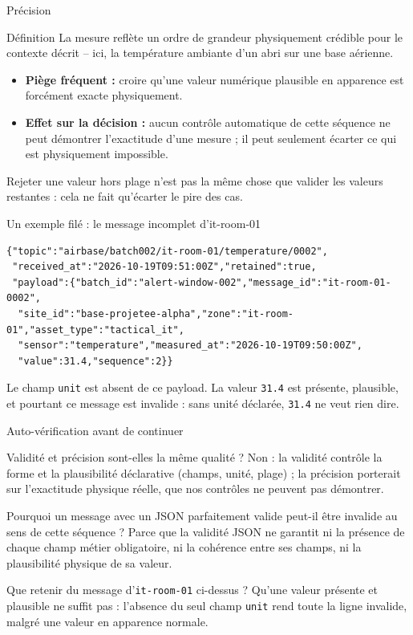 \documentclass[aspectratio=169]{beamer}
\begin{document}
\begin{frame}{Précision}
  \begin{block}{Définition}
    La mesure reflète un ordre de grandeur physiquement crédible pour le contexte décrit -- ici, la température ambiante d'un abri sur une base aérienne.
  \end{block}
  \begin{itemize}
    \item \textbf{Piège fréquent :} croire qu'une valeur numérique plausible en apparence est forcément exacte physiquement.
    \item \textbf{Effet sur la décision :} aucun contrôle automatique de cette séquence ne peut démontrer l'exactitude d'une mesure ; il peut seulement écarter ce qui est physiquement impossible.
  \end{itemize}
  \alert{Rejeter une valeur hors plage n'est pas la même chose que valider les valeurs restantes : cela ne fait qu'écarter le pire des cas.}
\end{frame}

\begin{frame}[fragile]{Un exemple filé : le message incomplet d'it-room-01}
  \scriptsize
  \begin{verbatim}
{"topic":"airbase/batch002/it-room-01/temperature/0002",
 "received_at":"2026-10-19T09:51:00Z","retained":true,
 "payload":{"batch_id":"alert-window-002","message_id":"it-room-01-0002",
  "site_id":"base-projetee-alpha","zone":"it-room-01","asset_type":"tactical_it",
  "sensor":"temperature","measured_at":"2026-10-19T09:50:00Z",
  "value":31.4,"sequence":2}}
  \end{verbatim}
  \normalsize
  \alert{Le champ \texttt{unit} est absent de ce payload. La valeur \texttt{31.4} est présente, plausible, et pourtant ce message est invalide : sans unité déclarée, \texttt{31.4} ne veut rien dire.}
\end{frame}

\begin{frame}{Auto-vérification avant de continuer}
  \small
  \begin{block}{Validité et précision sont-elles la même qualité ?}
    Non : la validité contrôle la forme et la plausibilité déclarative (champs, unité, plage) ; la précision porterait sur l'exactitude physique réelle, que nos contrôles ne peuvent pas démontrer.
  \end{block}
  \begin{block}{Pourquoi un message avec un JSON parfaitement valide peut-il être invalide au sens de cette séquence ?}
    Parce que la validité JSON ne garantit ni la présence de chaque champ métier obligatoire, ni la cohérence entre ses champs, ni la plausibilité physique de sa valeur.
  \end{block}
  \begin{block}{Que retenir du message d'\texttt{it-room-01} ci-dessus ?}
    Qu'une valeur présente et plausible ne suffit pas : l'absence du seul champ \texttt{unit} rend toute la ligne invalide, malgré une valeur en apparence normale.
  \end{block}
\end{frame}
\end{document}
